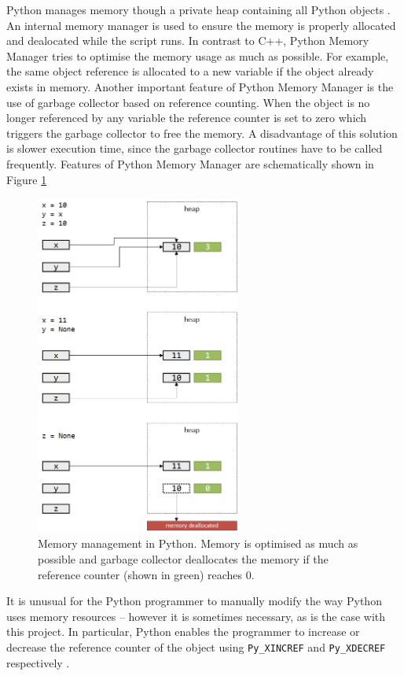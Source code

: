 Python manages memory though a private heap containing all Python objects \cite{PythonMemory}. 
An internal memory manager is used to ensure the memory is properly allocated and dealocated 
while the script runs. In contrast to C++, Python Memory Manager tries to optimise the memory 
usage as much as possible. For example, the same object reference is allocated to a new variable 
if the object already exists in memory. Another important feature of Python Memory Manager is 
the use of garbage collector based on reference counting. When the object is no longer referenced 
by any variable the reference counter is set to zero which triggers the garbage collector to free 
the memory. A disadvantage of this solution is slower execution time, since the garbage collector 
routines have to be called frequently. Features of Python Memory Manager are schematically shown 
in Figure \ref{fig:python_gc}

\begin{figure}[h!]
    \centering
    \includegraphics[width=0.6\textwidth]{img/python_gc}
    \caption{Memory management in Python. Memory is optimised as much as possible and garbage 
    collector deallocates the memory if the reference counter (shown in green) reaches 0.}
    \label{fig:python_gc}
\end{figure}

It is unusual for the Python programmer to manually modify the way Python uses memory resources 
-- however it is sometimes necessary, as is the case with this project. In particular, 
Python enables the programmer to increase or decrease the reference counter of the object 
using \texttt{Py\_XINCREF} and \texttt{Py\_XDECREF} respectively \cite{PythonManualMemory}.

